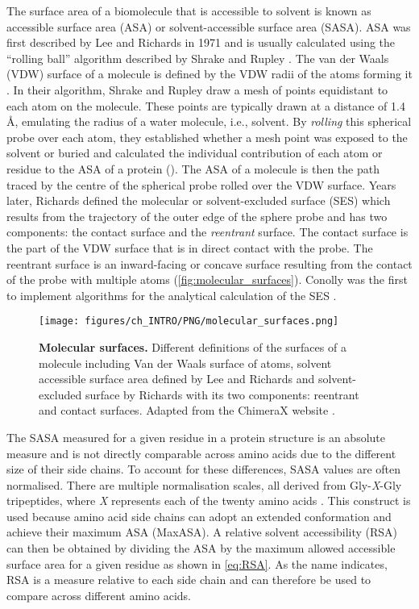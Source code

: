 The surface area of a biomolecule that is accessible to solvent is known as accessible surface area (ASA) or solvent-accessible surface area (SASA). ASA was first described by Lee and Richards in 1971 \cite{LEE_1971_ASA} and is usually calculated using the ``rolling ball'' algorithm described by Shrake and Rupley \cite{SHRAKE_1973_ASA}. The van der Waals (VDW) surface of a molecule is defined by the VDW radii of the atoms forming it \cite{1873_VANDERWAALS_VDW}. In their algorithm, Shrake and Rupley draw a mesh of points equidistant to each atom on the molecule. These points are typically drawn at a distance of 1.4 \AA{}, emulating the radius of a water molecule, i.e., solvent. By \textit{rolling} this spherical probe over each atom, they established whether a mesh point was exposed to the solvent or buried and calculated the individual contribution of each atom or residue to the ASA of a protein (). The ASA of a molecule is then the path traced by the centre of the spherical probe rolled over the VDW surface. Years later, Richards \cite{1977_RICHARDS_SSE} defined the molecular or solvent-excluded surface (SES) which results from the trajectory of the outer edge of the sphere probe and has two components: the contact surface and the \textit{reentrant} surface. The contact surface is the part of the VDW surface that is in direct contact with the probe. The reentrant surface is an inward-facing or concave surface resulting from the contact of the probe with multiple atoms (\autoref{fig:molecular_surfaces}). Conolly was the first to implement algorithms for the analytical calculation of the SES \cite{1983_CONNOLLY_SASA, 1983_CONNOLLY_SASA2}.

\begin{figure}[htb!]
    \centering
    \texttt{[image: figures/ch\_INTRO/PNG/molecular\_surfaces.png]}
    \caption[Molecular surfaces]{\textbf{Molecular surfaces.} Different definitions of the surfaces of a molecule including Van der Waals surface of atoms, solvent accessible surface area defined by Lee and Richards \cite{LEE_1971_ASA} and solvent-excluded surface by Richards \cite{1977_RICHARDS_SSE} with its two components: reentrant and contact surfaces. Adapted from the ChimeraX website \cite{surface_diagram}.}
    \label{fig:molecular_surfaces}
\end{figure}

The SASA measured for a given residue in a protein structure is an absolute measure and is not directly comparable across amino acids due to the different size of their side chains. To account for these differences, SASA values are often normalised. There are multiple normalisation scales, all derived from Gly-\textit{X}-Gly tripeptides, where \textit{X} represents each of the twenty amino acids \cite{1985_ROSE_MAXASA, MILLER_1987_MAXASA, TIEN_2013_RSA}. This construct is used because amino acid side chains can adopt an extended conformation and achieve their maximum ASA (MaxASA). A relative solvent accessibility (RSA) can then be obtained by dividing the ASA by the maximum allowed accessible surface area for a given residue as shown in \autoref{eq:RSA}. As the name indicates, RSA is a measure relative to each side chain and can therefore be used to compare across different amino acids.

